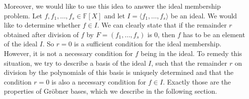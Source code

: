 \documentclass[thesis=M,english]{FITthesis}[2012/10/20]
\theoremstyle{remark}
\theoremstyle{definition}
\begin{document}
\noindent Moreover, we would like to use this idea to answer the ideal membership problem. Let $f, f_1, \ldots, f_s \in \mathbb{F}[X]$ and let $I = \langle f_1, \ldots, f_s \rangle$ be an ideal. We would like to determine whether $f \in I$. We can clearly state that if the remainder $r$ obtained after division of $f$ by $F = (f_1, \ldots, f_s)$ is $0$, then $f$ has to be an element of the ideal $I$. So $r=0$ is a sufficient condition for the ideal membership. However, it is not a necessary condition for $f$ being in the ideal. To remedy this situation, we try to describe a  basis of the ideal $I$, such that the remainder $r$ on division by the polynomials of this basis is uniquely determined and that the condition $r=0$ is also a necessary condition for $f \in I$. Exactly those are the properties of Gröbner bases, which we describe in the following section.
\end{document}
